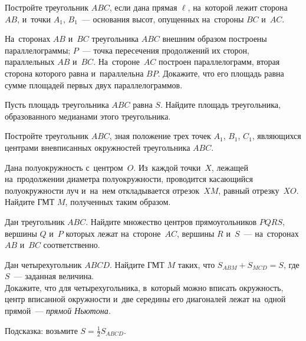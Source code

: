 


\begin{problems}

\item
Постройте треугольник $ABC$, если дана прямая $\ell$, на~которой лежит
сторона~$AB$, и~точки $A_1$, $B_1$~--- основания высот, опущенных
на~стороны $BC$ и~$AC$.

\item
На~сторонах $AB$ и~$BC$ треугольника $ABC$ внешним образом построены
параллелограммы;
$P$~--- точка пересечения продолжений их сторон, параллельных $AB$ и~$BC$.
На~стороне~$AC$ построен параллелограмм, вторая сторона которого равна
и~параллельна $BP$.
Докажите, что его площадь равна сумме площадей первых двух параллелограммов.

\item
Пусть площадь треугольника $ABC$ равна $S$.
Найдите площадь треугольника, образованного медианами этого треугольника.

\item
Постройте треугольник $ABC$, зная положение трех точек $A_1$, $B_1$, $C_1$,
являющихся центрами вневписанных окружностей треугольника $ABC$.

\item
Дана полуокружность с~центром~$O$.
Из~каждой точки~$X$, лежащей на~продолжении диаметра полуокружности, проводится
касающийся полуокружности луч и~на~нем откладывается отрезок~$XM$, равный
отрезку~$XO$.
Найдите ГМТ $M$, полученных таким образом.

\item
Дан треугольник $ABC$.
Найдите множество центров прямоугольников $PQRS$, вершины $Q$ и~$P$ которых
лежат на~стороне~$AC$, вершины $R$ и~$S$~--- на~сторонах $AB$ и~$BC$
соответственно.

\item
\subproblem
Дан четырехугольник $ABCD$.
Найдите ГМТ $M$ таких, что $S_{ABM} + S_{MCD} = S$, где $S$~--- заданная
величина.
\\
\subproblem
Докажите, что для четырехугольника, в~который можно вписать окружность, центр
вписанной окружности и~две середины его диагоналей лежат на~одной прямой~---
\emph{прямой Ньютона.}
\\
\begin{em}Подсказка: возьмите $S=\frac12 S_{ABCD}$.\end{em}

\end{problems}

